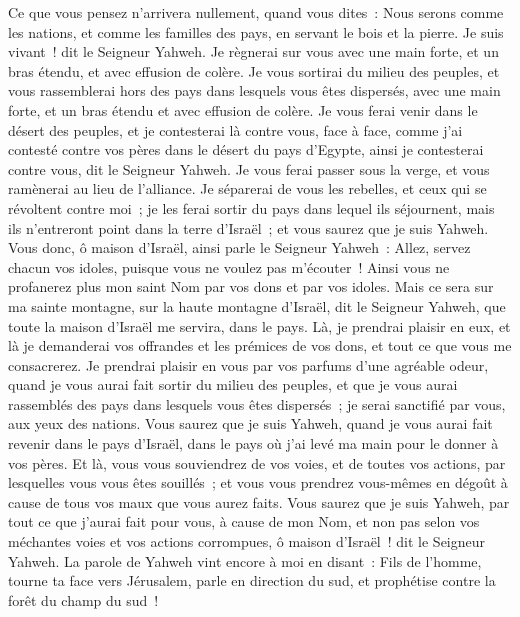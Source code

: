 \begin{multicols}{2}
Ce que vous pensez n'arrivera nullement, quand vous dites~: Nous serons comme les nations, et comme les familles des pays, en servant le bois et la pierre.
Je suis vivant~! dit le Seigneur Yahweh. Je règnerai sur vous avec une main forte, et un bras étendu, et avec effusion de colère.
Je vous sortirai du milieu des peuples, et vous rassemblerai hors des pays dans lesquels vous êtes dispersés, avec une main forte, et un bras étendu et avec effusion de colère.
Je vous ferai venir dans le désert des peuples, et je contesterai là contre vous, face à face,
comme j'ai contesté contre vos pères dans le désert du pays d'Egypte, ainsi je contesterai contre vous, dit le Seigneur Yahweh.
Je vous ferai passer sous la verge, et vous ramènerai au lieu de l'alliance.
Je séparerai de vous les rebelles, et ceux qui se révoltent contre moi~; je les ferai sortir du pays dans lequel ils séjournent, mais ils n'entreront point dans la terre d'Israël~; et vous saurez que je suis Yahweh.
Vous donc, ô maison d'Israël, ainsi parle le Seigneur Yahweh~: Allez, servez chacun vos idoles, puisque vous ne voulez pas m'écouter~! Ainsi vous ne profanerez plus mon saint Nom par vos dons et par vos idoles.
Mais ce sera sur ma sainte montagne, sur la haute montagne d'Israël, dit le Seigneur Yahweh, que toute la maison d'Israël me servira, dans le pays. Là, je prendrai plaisir en eux, et là je demanderai vos offrandes et les prémices de vos dons, et tout ce que vous me consacrerez.
Je prendrai plaisir en vous par vos parfums d'une agréable odeur, quand je vous aurai fait sortir du milieu des peuples, et que je vous aurai rassemblés des pays dans lesquels vous êtes dispersés~; je serai sanctifié par vous, aux yeux des nations.
Vous saurez que je suis Yahweh, quand je vous aurai fait revenir dans le pays d'Israël, dans le pays où j'ai levé ma main pour le donner à vos pères.
Et là, vous vous souviendrez de vos voies, et de toutes vos actions, par lesquelles vous vous êtes souillés~; et vous vous prendrez vous-mêmes en dégoût à cause de tous vos maux que vous aurez faits.
Vous saurez que je suis Yahweh, par tout ce que j'aurai fait pour vous, à cause de mon Nom, et non pas selon vos méchantes voies et vos actions corrompues, ô maison d'Israël~! dit le Seigneur Yahweh.
\VerseOne{}La parole de Yahweh vint encore à moi en disant~:
Fils de l'homme, tourne ta face vers Jérusalem, parle en direction du sud, et prophétise contre la forêt du champ du sud~!

\end{multicols}
